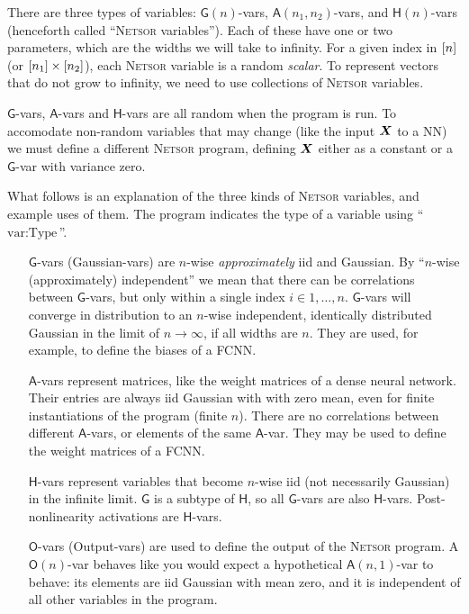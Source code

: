 \documentclass[accepted]{uai2021} %
\newcommand{\Netsor}{\textsc{Netsor}\xspace}
\newcommand{\Gva}{\mathsf{G}}
\newcommand{\Hva}{\mathsf{H}}
\newcommand{\Ava}{\mathsf{A}}
\newcommand{\Ova}{\mathsf{O}}
\newcommand{\0}{\boldsymbol{0}}
\newcommand{\1}{\boldsymbol{1}}
\begin{document}
There are three types of variables: $\Gva(n)$-vars, $\Ava(n_1, n_2)$-vars, and
$\Hva(n)$-vars (henceforth called ``\Netsor variables''). Each of these have one
or two parameters, which are the widths we will take to infinity. For a given
index in $[n]$ (or $[n_1] \times [n_2]$), each \Netsor
variable is a random \emph{scalar}. To represent vectors that do not grow to
infinity, we need to use collections of \Netsor variables.

$\Gva$-vars, $\Ava$-vars and $\Hva$-vars are all random when the program is run. To accomodate non-random variables that may change (like the input ${\bm{X}}$ to a \ac{NN}) we must define a different \Netsor program, defining ${\bm{X}}$ either as a constant or a $\Gva$-var with variance zero.

What follows is an explanation of the three kinds of \Netsor variables, and
example uses of them. The program indicates the type of a variable using
``$\text{var} : \text{Type}$''.
\begin{itemize}
\item[$\Gva$-vars] (Gaussian-vars) are $n$-wise \emph{approximately}
\ac{iid} and Gaussian. By ``$n$-wise (approximately) independent'' we mean that there can be
correlations between $\Gva$-vars, but only within a single index $i \in 1,\dots,n$.
$\Gva$-vars will converge in
distribution to an $n$-wise independent, identically distributed Gaussian in the limit of $n \to \infty$, if
all widths are $n$. They are used, for example, to define the biases of a \ac{FCNN}.

\item[$\Ava$-vars] represent matrices,
like the weight matrices of a dense neural network. Their entries are always \ac{iid}
Gaussian with with zero mean, even for finite instantiations of the program
(finite $n$).
There are no correlations between different $\Ava$-vars, or elements of the same $\Ava$-var. They may be used to define the weight matrices of a \ac{FCNN}.

\item[$\Hva$-vars] represent variables that become $n$-wise \ac{iid} (not necessarily
Gaussian) in the
infinite limit. $\Gva$ is a subtype of $\Hva$, so all $\Gva$-vars are also $\Hva$-vars. Post-nonlinearity activations are $\Hva$-vars.

\item[$\Ova$-vars] (Output-vars) are used to define the output of the \Netsor
program. A $\Ova(n)$-var behaves like you would expect a hypothetical $\Ava(n, 1)$-var to behave: its elements are \ac{iid} Gaussian with mean zero, and it is independent of all other variables in the program.
\end{itemize}
\end{document}
